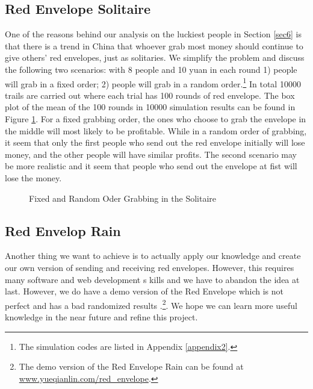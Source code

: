 \documentclass{scrartcl}
\begin{document}
\subsection{Red Envelope Solitaire}
One of the reasons behind our analysis on the luckiest people in Section \ref{sec6} is that there is a trend in China that whoever grab most money should continue to give others' red envelopes, just as solitaries. We simplify the problem and discuss the following two scenarios: with 8 people and 10 yuan in each round 1) people will grab in a fixed order; 2) people will grab in a random order.\footnote{The simulation codes are listed in Appendix \ref{appendix2}.} In total 10000 trails are carried out where each trial has 100 rounds of red envelope. The box plot of the mean of the 100 rounds in 10000 simulation results can be found in Figure \ref{luckgamesim}. For a fixed grabbing order, the ones who choose to grab the envelope in the middle will most likely to be profitable. While in a random order of grabbing, it seem that only the first people who send out the red envelope initially will lose money, and the other people will have similar profits. The second scenario may be more realistic and it seem that people who send out the envelope at fist will lose the money.

\begin{figure}[H]
\centering    
{}     
\caption{Fixed and Random Oder Grabbing in the Solitaire}
\label{luckgamesim} 
\end{figure}
\subsection{Red Envelop Rain}
Another thing we want to achieve is to actually apply our knowledge and create our own version of sending and receiving red envelopes. However, this requires many software and web development s kills and we have to abandon the idea at last. However, we do have a demo version of the Red Envelope which is not perfect and has a bad randomized results \cite{byzantine-pki}.\footnote{The demo version of the Red Envelope Rain can be found at \url{www.yueqianlin.com/red_envelope}.}. We hope we can learn more useful knowledge in the near future and refine this project.
\end{document}
